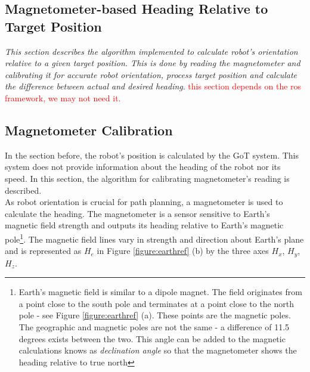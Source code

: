 \subsection{Magnetometer-based Heading Relative to Target Position}

\textit{This section describes the algorithm implemented to calculate robot's orientation relative to a given target position. This is done by reading the magnetometer and calibrating it for accurate robot orientation, process target position and calculate the difference between actual and desired heading}.  
 \textcolor{red}{this section depends on the ros framework, we may not need it.}

\subsection{Magnetometer Calibration}
In the section before, the robot's position is calculated by the GoT system. This system does not provide information about the heading of the robot nor its speed. In this section, the algorithm for calibrating magnetometer's reading is described.\\

As robot orientation is crucial for path planning, a magnetometer is used to calculate the heading. The magnetometer is a sensor sensitive to Earth's magnetic field strength and outputs its heading relative to Earth's magnetic pole\footnote{Earth's magnetic field is similar to a dipole magnet. The field originates from a point close to the south pole and terminates at a point close to the north pole - see Figure \ref{figure:earthref} (a). These points are the magnetic poles. The geographic and magnetic poles are not the same - a difference of 11.5 degrees exists between the two. This angle can be added to the magnetic calculations knows as \textit{declination angle} so that the magnetometer shows the heading relative to true north}. The magnetic field lines vary in strength and direction about Earth's plane and is represented as $H_e$ in Figure \ref{figure:earthref} (b) by the three axes $H_x$, $H_y$, $H_z$. \cite{magnetometer} \\

